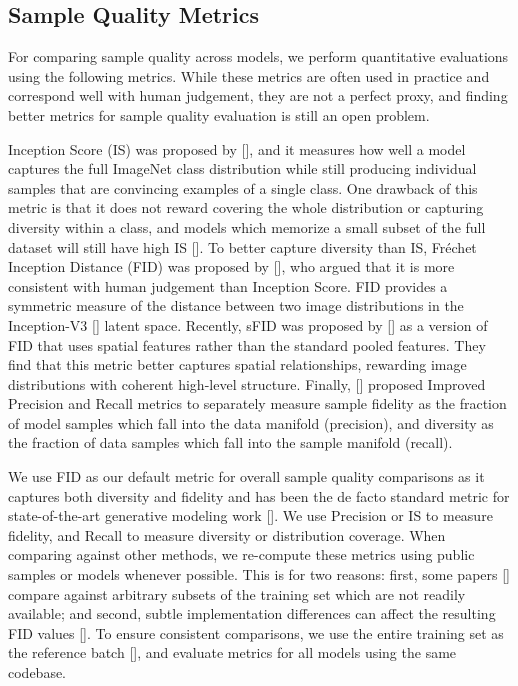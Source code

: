 \documentclass{article}
\newcommand{\shortcite}[1]{[\citenum{#1}]}
\newcommand{\namecite}[1]{\citeauthor{#1} [\citenum{#1}]}
\begin{document}
\subsection{Sample Quality Metrics}

For comparing sample quality across models, we perform quantitative evaluations using the following metrics. While these metrics are often used in practice and correspond well with human judgement, they are not a perfect proxy, and finding better metrics for sample quality evaluation is still an open problem.

Inception Score (IS) was proposed by \namecite{inceptionscore}, and it measures how well a model captures the full ImageNet class distribution while still producing individual samples that are convincing examples of a single class. One drawback of this metric is that it does not reward covering the whole distribution or capturing diversity within a class, and models which memorize a small subset of the full dataset will still have high IS \shortcite{noteoninceptionscore}. To better capture diversity than IS, Fréchet Inception Distance (FID) was proposed by \namecite{fid}, who argued that it is more consistent with human judgement than Inception Score. FID provides a symmetric measure of the distance between two image distributions in the Inception-V3 \shortcite{inceptionv3} latent space. Recently, sFID was proposed by \namecite{dctransformer} as a version of FID that uses spatial features rather than the standard pooled features. They find that this metric better captures spatial relationships, rewarding image distributions with coherent high-level structure. Finally, \namecite{precrecall} proposed Improved Precision and Recall metrics to separately measure sample fidelity as the fraction of model samples which fall into the data manifold (precision), and diversity as the fraction of data samples which fall into the sample manifold (recall).









We use FID as our default metric for overall sample quality comparisons as it captures both diversity and fidelity and has been the de facto standard metric for state-of-the-art generative modeling work \shortcite{stylegan,stylegan2,biggan,ddpm}. We use Precision or IS to measure fidelity, and Recall to measure diversity or distribution coverage. When comparing against other methods, we re-compute these metrics using public samples or models whenever possible. This is for two reasons: first, some papers \shortcite{stylegan,stylegan2,ddpm} compare against arbitrary subsets of the training set which are not readily available; and second, subtle implementation differences can affect the resulting FID values \shortcite{cleanfid}. To ensure consistent comparisons, we use the entire training set as the reference batch \shortcite{fid,biggan}, and evaluate metrics for all models using the same codebase.
\end{document}
